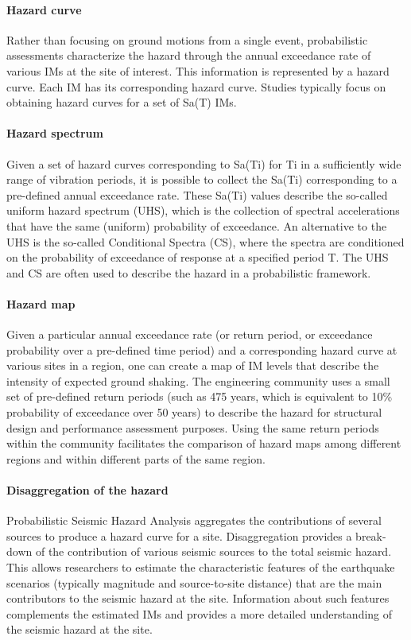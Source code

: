 \paragraph{Hazard curve } Rather than focusing on ground motions from a single event, probabilistic assessments characterize the hazard through the annual exceedance rate of various IMs at the site of interest. This information is represented by a hazard curve. Each IM has its corresponding hazard curve. Studies typically focus on obtaining hazard curves for a set of Sa(T) IMs. 

\paragraph{Hazard spectrum} Given a set of hazard curves corresponding to Sa(Ti) for Ti in a sufficiently wide range of vibration periods, it is possible to collect the Sa(Ti) corresponding to a pre-defined annual exceedance rate. These Sa(Ti) values describe the so-called uniform hazard spectrum (UHS), which is the collection of spectral accelerations that have the same (uniform) probability of exceedance. An alternative to the UHS is the so-called Conditional Spectra (CS), where the spectra are conditioned on the probability of exceedance of response at a specified period T. The UHS and CS are often used to describe the hazard in a probabilistic framework.

\paragraph{Hazard map} Given a particular annual exceedance rate (or return period, or exceedance probability over a pre-defined time period) and a corresponding hazard curve at various sites in a region, one can create a map of IM levels that describe the intensity of expected ground shaking. The engineering community uses a small set of pre-defined return periods (such as 475 years, which is equivalent to 10\% probability of exceedance over 50 years) to describe the hazard for structural design and performance assessment purposes. Using the same return periods within the community facilitates the comparison of hazard maps among different regions and within different parts of the same region.

\paragraph{Disaggregation of the hazard} Probabilistic Seismic Hazard Analysis aggregates the contributions of several sources to produce a hazard curve for a site. Disaggregation provides a break-down of the contribution of various seismic sources to the total seismic hazard. This allows researchers to estimate the characteristic features of the earthquake scenarios (typically magnitude and source-to-site distance) that are the main contributors to the seismic hazard at the site. Information about such features complements the estimated IMs and provides a more detailed understanding of the seismic hazard at the site.

